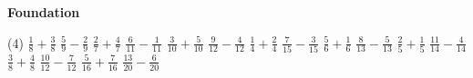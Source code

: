 \documentclass[17pt,a4paper,landscape]{extarticle}
\begin{document}
\sffamily
\boldmath

\boldmath

{\LARGE \textbf{Foundation}}
\begin{tasks}(4)
\task \mbox{$\frac{1}{8}+\frac{3}{8}$}
\task \mbox{$\frac{5}{9}-\frac{2}{9}$}
\task \mbox{$\frac{2}{7}+\frac{4}{7}$}
\task \mbox{$\frac{6}{11}-\frac{1}{11}$}
\task \mbox{$\frac{3}{10}+\frac{5}{10}$}
\task \mbox{$\frac{9}{12}-\frac{4}{12}$}
\task \mbox{$\frac{1}{4}+\frac{2}{4}$}
\task \mbox{$\frac{7}{15}-\frac{3}{15}$}
\task \mbox{$\frac{5}{6}+\frac{1}{6}$}
\task \mbox{$\frac{8}{13}-\frac{5}{13}$}
\task \mbox{$\frac{2}{5}+\frac{1}{5}$}
\task \mbox{$\frac{11}{14}-\frac{4}{14}$}
\task \mbox{$\frac{3}{8}+\frac{4}{8}$}
\task \mbox{$\frac{10}{12}-\frac{7}{12}$}
\task \mbox{$\frac{5}{16}+\frac{7}{16}$}
\task \mbox{$\frac{13}{20}-\frac{6}{20}$}
\end{tasks}
\end{document}
